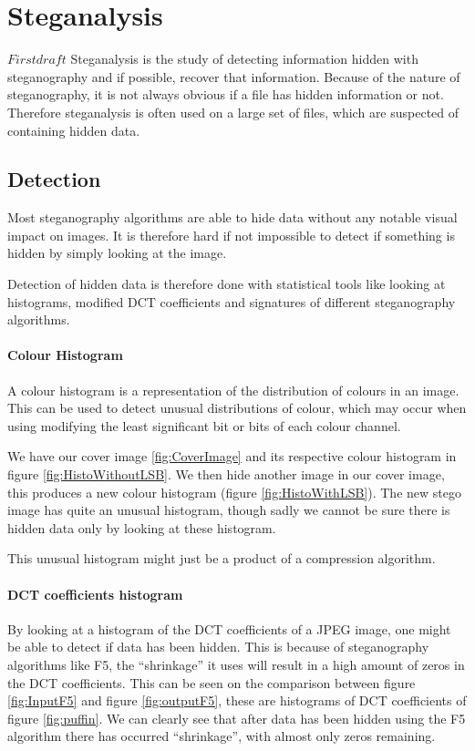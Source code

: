 \section{Steganalysis}$First draft$
\label{steganalysis}
Steganalysis is the study of detecting information hidden with steganography and if possible, recover that information.
Because of the nature of steganography, it is not always obvious if a file has hidden information or not.
Therefore steganalysis is often used on a large set of files, which are suspected of containing hidden data.

\subsection{Detection}
Most steganography algorithms are able to hide data without any notable visual impact on images.
It is therefore hard if not impossible to detect if something is hidden by simply looking at the image.

Detection of hidden data is therefore done with statistical tools like looking at histograms, modified DCT coefficients and signatures of different steganography algorithms.

\paragraph*{Colour Histogram}
A colour histogram is a representation of the distribution of colours in an image. 
This can be used to detect unusual distributions of colour, which may occur when using modifying the least significant bit or bits of each colour channel.

We have our cover image \ref{fig:CoverImage} and its respective colour histogram in figure \ref{fig:HistoWithoutLSB}.
We then hide another image in our cover image, this produces a new colour histogram (figure \ref{fig:HistoWithLSB}).
The new stego image has quite an unusual histogram, though sadly we cannot be sure there is hidden data only by looking at these histogram.

This unusual histogram might just be a product of a compression algorithm.

\paragraph*{DCT coefficients histogram}
By looking at a histogram of the DCT coefficients of a JPEG image, one might be able to detect if data has been hidden.
This is because of steganography algorithms like F5, the ``shrinkage'' it uses will result in a high amount of zeros in the DCT coefficients.
This can be seen on the comparison between figure \ref{fig:InputF5} and figure \ref{fig:outputF5}, these are histograms of DCT coefficients of figure \ref{fig:puffin}.
We can clearly see that after data has been hidden using the F5 algorithm there has occurred ``shrinkage'', with almost only zeros remaining.

